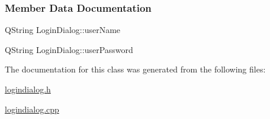 \subsubsection{Member Data Documentation}
\mbox{\label{classLoginDialog_ac3aff74cd5cb23bb5e269775fd7b7672}} 
{\footnotesize\ttfamily Q\+String Login\+Dialog\+::\texorpdfstring{user\+Name}{userName}}

\mbox{\label{classLoginDialog_aabe40abeacdb2903b5fa9a61a8562201}} 
{\footnotesize\ttfamily Q\+String Login\+Dialog\+::\texorpdfstring{user\+Password}{userPassword}}



The documentation for this class was generated from the following files\+:\begin{DoxyCompactItemize}
\item 
\mbox{\hyperlink{logindialog_8h}{logindialog.\+h}}\item 
\mbox{\hyperlink{logindialog_8cpp}{logindialog.\+cpp}}\end{DoxyCompactItemize}
\newpage